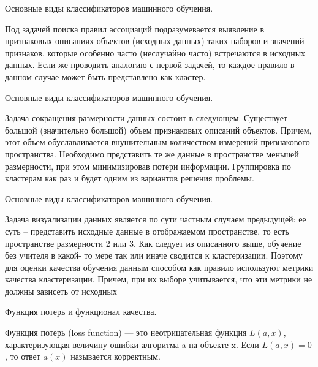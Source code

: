 \documentclass{beamer}
\begin{document}
\begin{frame}{Основные виды классификаторов машинного обучения.}

Под задачей поиска правил ассоциаций подразумевается
выявление в признаковых описаниях объектов (исходных данных)
таких наборов и значений признаков, которые особенно часто
(неслучайно часто) встречаются в исходных данных. Если же
проводить аналогию с первой задачей, то каждое правило в данном
случае может быть представлено как кластер.

\end{frame}


\begin{frame}{Основные виды классификаторов машинного обучения.}


Задача сокращения размерности данных состоит в следующем.
Существует большой (значительно большой) объем признаковых
описаний объектов. Причем, этот объем обуславливается
внушительным количеством измерений признакового пространства.
Необходимо представить те же данные в пространстве меньшей
размерности, при этом минимизировав потери информации.
Группировка по кластерам как раз и будет одним из вариантов
решения проблемы.
\end{frame}


\begin{frame}{Основные виды классификаторов машинного обучения.}


Задача визуализации данных является по сути частным случаем
предыдущей: ее суть – представить исходные данные в отображаемом
пространстве, то есть пространстве размерности 2 или 3.
Как следует из описанного выше, обучение без учителя в какой-
то мере так или иначе сводится к кластеризации. Поэтому для оценки
качества обучения данным способом как правило используют
метрики качества кластеризации. Причем, при их выборе
учитывается, что эти метрики не должны зависеть от исходных

\end{frame}






\begin{frame}{Функция потерь и функционал качества.}

Функция потерь (loss function) — это неотрицательная функция $L (a, x)$,
характеризующая величину ошибки алгоритма a на объекте x. Если $L (a, x) = 0$,
то ответ $a(x)$ называется корректным.



\end{frame}
\end{document}
